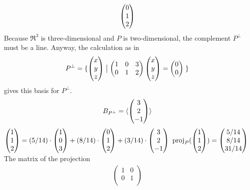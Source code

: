 \begin{exercises}
\begin{answer}
\begin{exparts}
\begin{equation*}
{                          \colvec{0 \\ 1 \\ 2} }
          \end{equation*}
        \partsitem Because $\Re^3$ is three-dimensional 
          and $P$ is two-dimensional, the complement $P^\perp$ must be
          a line.
          Anyway, the calculation as in 
          \begin{equation*}
            P^\perp=\set{\colvec{x \\ y \\ z}
                         \suchthat
                         \begin{pmatrix}
                           1  &0 &3  \\
                           0  &1 &2
                         \end{pmatrix}
                         \colvec{x \\ y \\ z}
                         =\colvec{0 \\ 0}\;}
          \end{equation*}
          gives this basis for $P^\perp$.
          \begin{equation*}
            B_{P^\perp}=\sequence{\colvec{3 \\ 2 \\ -1} }
          \end{equation*}
        \partsitem $ \displaystyle       
             \colvec{1 \\ 1 \\ 2}=
             (5/14)\cdot\colvec{1 \\ 0 \\ 3}+
             (8/14)\cdot\colvec{0 \\ 1 \\ 2}+
             (3/14)\cdot\colvec{3 \\ 2 \\ -1}$
        \partsitem $\proj{\colvec{1 \\ 1 \\ 2}}{P}
          =\colvec{5/14 \\ 8/14 \\ 31/14}$
        \partsitem The matrix of the projection
          \begin{align*}
            \begin{pmatrix}
              1  &0 \\
              0  &1 \\

\end{pmatrix}
\end{align*}
\end{exparts}
\end{answer}
\end{exercises}
